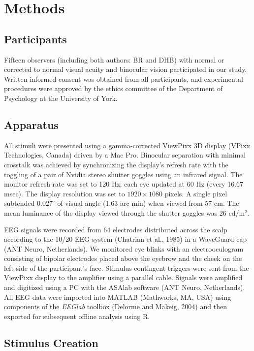 \documentclass[review,
  12pt,
]{elsarticle}
\begin{document}
\section{Methods}\label{methods}

\subsection{Participants}\label{participants}

Fifteen observers (including both authors: BR and DHB) with normal or
corrected to normal visual acuity and binocular vision participated in
our study. Written informed consent was obtained from all participants,
and experimental procedures were approved by the ethics committee of the
Department of Psychology at the University of York.

\subsection{Apparatus}\label{apparatus}

All stimuli were presented using a gamma-corrected ViewPixx 3D display
(VPixx Technologies, Canada) driven by a Mac Pro. Binocular separation
with minimal crosstalk was achieved by synchronizing the display's
refresh rate with the toggling of a pair of Nvidia stereo shutter
goggles using an infrared signal. The monitor refresh rate was set to
120 Hz; each eye updated at 60 Hz (every 16.67 msec). The display
resolution was set to \(1920 \times 1080\) pixels. A single pixel
subtended \(0.027^\circ\) of visual angle (1.63 arc min) when viewed
from 57 cm. The mean luminance of the display viewed through the shutter
goggles was 26 cd/m\(^2\).

EEG signals were recorded from 64 electrodes distributed across the
scalp according to the 10/20 EEG system (Chatrian et al., 1985) in a
WaveGuard cap (ANT Neuro, Netherlands). We monitored eye blinks with an
electrooculogram consisting of bipolar electrodes placed above the
eyebrow and the cheek on the left side of the participant's face.
Stimulus-contingent triggers were sent from the ViewPixx display to the
amplifier using a parallel cable. Signals were amplified and digitized
using a PC with the ASAlab software (ANT Neuro, Netherlands). All EEG
data were imported into MATLAB (Mathworks, MA, USA) using components of
the \textit{EEGlab} toolbox (Delorme and Makeig, 2004) and then exported
for subsequent offline analysis using R.

\subsection{Stimulus Creation}\label{stimulus-creation}
\end{document}
